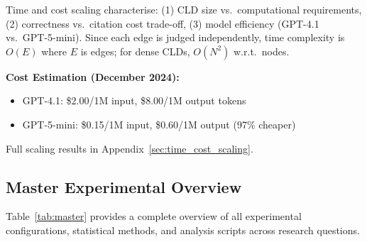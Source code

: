 Time and cost scaling characterise: (1) CLD size vs.\ computational requirements, (2) correctness vs.\ citation cost trade-off, (3) model efficiency (GPT-4.1 vs.\ GPT-5-mini). Since each edge is judged independently, time complexity is $O(E)$ where $E$ is edges; for dense CLDs, $O(N^2)$ w.r.t.\ nodes.

\textbf{Cost Estimation (December 2024):}
\begin{itemize}[noitemsep]
    \item GPT-4.1: \$2.00/1M input, \$8.00/1M output tokens
    \item GPT-5-mini: \$0.15/1M input, \$0.60/1M output (97\% cheaper)
\end{itemize}

Full scaling results in Appendix~\ref{sec:time_cost_scaling}.

\begin{landscape}
\section{Master Experimental Overview}
\label{sec:master_experimental_overview}

Table~\ref{tab:master} provides a complete overview of all experimental configurations, statistical methods, and analysis scripts across research questions.


\end{landscape}
